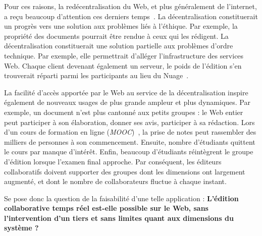 Pour ces raisons, la redécentralisation du Web, et plus généralement de
l'internet, a reçu beaucoup d'attention ces derniers temps~\cite{benet2014ipfs,
  maelstrom, mansour2016demonstration, wood2014ethereum}.  La décentralisation
constituerait un progrès vers une solution aux problèmes liés à l'éthique.  Par
exemple, la propriété des documents pourrait être rendue à ceux qui les
rédigent. La décentralisation constituerait une solution partielle aux problèmes
d'ordre technique. Par exemple, elle permettrait d'alléger l'infrastructure des
services Web. Chaque client devenant également un serveur, le poids de l'édition
s'en trouverait réparti parmi les participants au lieu du
Nuage~\cite{mell2011national}. 

La facilité d'accès apportée par le Web au service de la décentralisation
inspire également de nouveaux usages de plus grande ampleur et plus
dynamiques. Par exemple, un document n'est plus cantonné aux petits groupes : le
Web entier peut participer à son élaboration, donner ses avis, participer à sa
rédaction. Lors d'un cours de formation en ligne
(\emph{MOOC})~\cite{breslow2013studying}, 
la prise de notes peut rassembler des milliers de
personnes à son commencement. Ensuite, nombre d'étudiants quittent le cours par
manque d'intérêt. Enfin, beaucoup d'étudiants réintègrent le groupe d'édition
lorsque l'examen final approche.  Par conséquent, les éditeurs collaboratifs
doivent supporter des groupes dont les dimensions ont largement augmenté, et
dont le nombre de collaborateurs fluctue à chaque instant.

Se pose donc la question de la faisabilité d'une telle application :
\textbf{L'édition collaborative temps réel est-elle possible sur le Web, sans
  l'intervention d'un tiers et sans limites quant aux dimensions du système ?}

